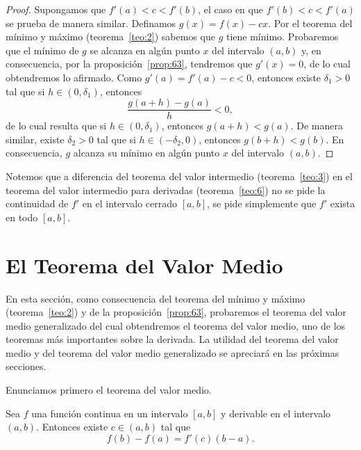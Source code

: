 \documentclass[12pt,a4paper]{book}
\begin{document}
    \begin{proof}
        Supongamos que $f'(a)<c<f'(b)$, el caso en que $f'(b)<
        c<f'(a)$ se prueba de manera similar. Definamos $g(x)=f(x)-cx$. Por
        el teorema del mínimo y máximo (teorema~\ref{teo:2}) sabemos que $g$ tiene mínimo.
        Probaremos que el mínimo de $g$ se alcanza en algún punto $x$ del intervalo
        $(a,b)$ y, en consecuencia, por la proposición~\ref{prop:63}, tendremos que $g'(x)=0$,
        de lo cual obtendremos lo afirmado. Como $g'(a)=f'(a)-c<0$, entonces
        existe $\delta_{1}>0$ tal que si $h\in(0,\delta_{1})$, entonces
        \begin{equation*}
            \frac{g(a+h)-g(a)}{h}<0,
        \end{equation*}
        de lo cual resulta que si $h\in(0,\delta_{1})$, entonces $g(a+h)<g(a)$. De manera
        similar, existe $\delta_{2}>0$ tal que si $h\in(-\delta_{2},0)$, entonces $g(b+h)<g(b)$. En
        consecuencia, $g$ alcanza su mínimo en algún punto $x$ del intervalo $(a,b)$.
    \end{proof}

    Notemos que a diferencia del teorema del valor intermedio (teorema~\ref{teo:3})
    en el teorema del valor intermedio para derivadas (teorema~\ref{teo:6}) no se pide la
    continuidad de $f'$ en el intervalo cerrado $[a,b]$, se pide simplemente que $f'$
    exista en todo $[a,b]$.

    \section{El Teorema del Valor Medio}

    En esta sección, como consecuencia del teorema del mínimo y máximo
    (teorema~\ref{teo:2}) y de la proposición~\ref{prop:63}, probaremos el teorema del valor medio
    generalizado del cual obtendremos el teorema del valor medio, uno de los
    teoremas más importantes sobre la derivada. La utilidad del teorema del
    valor medio y del teorema del valor medio generalizado se apreciará en las
    próximas secciones.

    Enunciamos primero el teorema del valor medio.

    \begin{teorema}\label{teo:7}
        Sea $f$ una función continua en un intervalo
        $[a,b]$ y derivable en el intervalo $(a,b)$. Entonces existe $c\in(a,b)$ tal que
        \begin{equation*}
            f(b)-f(a)=f'(c)(b-a).
        \end{equation*}
    \end{teorema}
\end{document}
